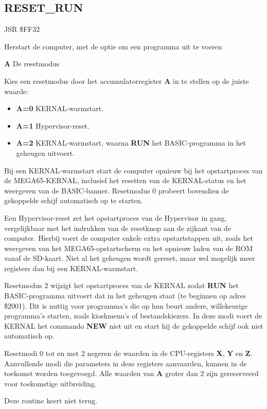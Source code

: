 
\newpage
\subsection{RESET{\_}RUN}
\label{KERNAL Jump Table!RESET_RUN}
\begin{description}[leftmargin=2cm,style=nextline]
    \item [Adres:] JSR \$FF32    \item [Omschrijving:] Herstart de computer, met de optie om een programma uit te voeren    \item [Invoer:]        \textbf{A} De resetmodus

    \item [Opmerkingen:]        Kies een resetmodus door het accumulatorregister {\bf A} in te stellen op de juiste waarde:
        \begin{itemize}
            \item {\bf A=0} KERNAL-warmstart.            \item {\bf A=1} Hypervisor-reset.            \item {\bf A=2} KERNAL-warmstart, waarna {\bf RUN} het BASIC-programma in het geheugen uitvoert.
        \end{itemize}

        Bij een KERNAL-warmstart start de computer opnieuw bij het opstartproces van de MEGA65-KERNAL, inclusief het resetten van de KERNAL-status en het weergeven van de BASIC-banner. Resetmodus 0 probeert bovendien de gekoppelde schijf automatisch op te starten.

        Een Hypervisor-reset zet het opstartproces van de Hypervisor in gang, vergelijkbaar met het indrukken van de resetknop aan de zijkant van de computer. Hierbij voert de computer enkele extra opstartstappen uit, zoals het weergeven van het MEGA65-opstartscherm en het opnieuw laden van de ROM vanaf de SD-kaart. Niet al het geheugen wordt gereset, maar wel mogelijk meer registers dan bij een KERNAL-warmstart.

        Resetmodus 2 wijzigt het opstartproces van de KERNAL zodat {\bf RUN} het BASIC-programma uitvoert dat in het geheugen staat (te beginnen op adres \$2001). Dit is nuttig voor programma's die op hun beurt andere, willekeurige programma's starten, zoals kioskmenu's of bestandskiezers. In deze modi voert de KERNAL het commando {\bf NEW} niet uit en start hij de gekoppelde schijf ook niet automatisch op.

        Resetmodi 0 tot en met 2 negeren de waarden in de CPU-registers {\bf X}, {\bf Y} en {\bf Z}. Aanvullende modi die parameters in deze registers aanvaarden, kunnen in de toekomst worden toegevoegd. Alle waarden van {\bf A} groter dan 2 zijn gereserveerd voor toekomstige uitbreiding.

        Deze routine keert niet terug.    \item [Voorbeeld:]
\end{description}


